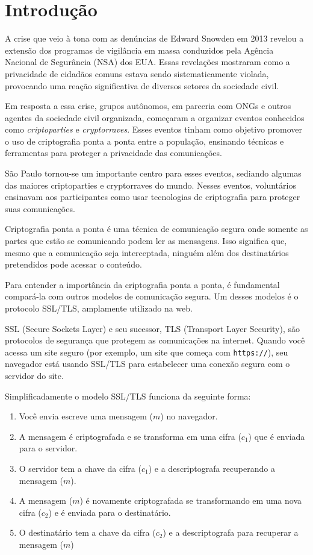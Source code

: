 \chapter{Introdução}
\label{cha:introducao}

A crise que veio à tona com as denúncias de Edward Snowden em 2013 revelou a extensão dos programas de vigilância em massa conduzidos pela Agência Nacional de Segurância (NSA) dos EUA.
Essas revelações mostraram como a privacidade de cidadãos comuns estava sendo sistematicamente violada, provocando uma reação significativa de diversos setores da sociedade civil.

Em resposta a essa crise, grupos autônomos, em parceria com ONGs e outros agentes da sociedade civil organizada, começaram a organizar eventos conhecidos como {\em criptoparties} e {\em cryptorraves}.
Esses eventos tinham como objetivo promover o uso de criptografia ponta a ponta entre a população, ensinando técnicas e ferramentas para proteger a privacidade das comunicações.

São Paulo tornou-se um importante centro para esses eventos, sediando algumas das maiores criptoparties e cryptorraves do mundo.
Nesses eventos, voluntários ensinavam aos participantes como usar tecnologias de criptografia para proteger suas comunicações.

Criptografia ponta a ponta é uma técnica de comunicação segura onde somente as partes que estão se comunicando podem ler as mensagens.
Isso significa que, mesmo que a comunicação seja interceptada, ninguém além dos destinatários pretendidos pode acessar o conteúdo.

Para entender a importância da criptografia ponta a ponta, é fundamental compará-la com outros modelos de comunicação segura.
Um desses modelos é o protocolo SSL/TLS, amplamente utilizado na web.

SSL (Secure Sockets Layer) e seu sucessor, TLS (Transport Layer Security), são protocolos de segurança que protegem as comunicações na internet.
Quando você acessa um site seguro (por exemplo, um site que começa com {\tt https://}), seu navegador está usando SSL/TLS para estabelecer uma conexão segura com o servidor do site.

Simplificadamente o modelo SSL/TLS funciona da seguinte forma:

\begin{enumerate}
\item Você envia escreve uma mensagem ($m$) no navegador.
\item A mensagem é criptografada e se transforma em uma cifra ($c_1$) que é enviada para o servidor.
\item O servidor tem a chave da cifra ($c_1$) e a descriptografa recuperando a mensagem ($m$).
\item A mensagem ($m$) é novamente criptografada se transformando em uma nova cifra ($c_2$) e é enviada para o destinatário.
\item O destinatário tem a chave da cifra ($c_2$) e a descriptografa para recuperar a mensagem ($m$)
\end{enumerate}

